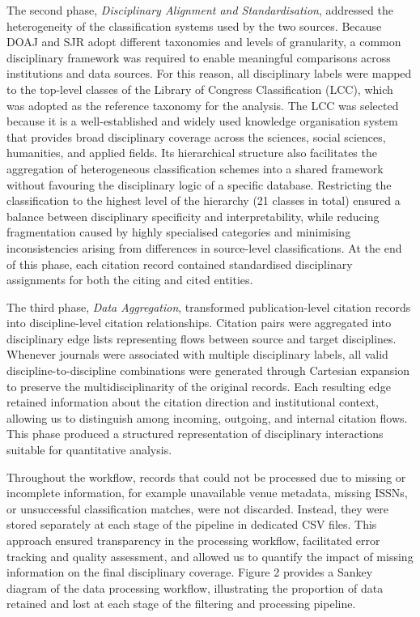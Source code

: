 \documentclass[year=2026]{cup-journal}
\begin{document}
The second phase, \textit{Disciplinary Alignment and Standardisation}, addressed the heterogeneity of the classification systems used by the two sources. Because DOAJ and SJR adopt different taxonomies and levels of granularity, a common disciplinary framework was required to enable meaningful comparisons across institutions and data sources. For this reason, all disciplinary labels were mapped to the top-level classes of the Library of Congress Classification (LCC), which was adopted as the reference taxonomy for the analysis. The LCC was selected because it is a well-established and widely used knowledge organisation system that provides broad disciplinary coverage across the sciences, social sciences, humanities, and applied fields. Its hierarchical structure also facilitates the aggregation of heterogeneous classification schemes into a shared framework without favouring the disciplinary logic of a specific database. Restricting the classification to the highest level of the hierarchy (21 classes in total) ensured a balance between disciplinary specificity and interpretability, while reducing fragmentation caused by highly specialised categories and minimising inconsistencies arising from differences in source-level classifications. At the end of this phase, each citation record contained standardised disciplinary assignments for both the citing and cited entities.

The third phase, \textit{Data Aggregation}, transformed publication-level citation records into discipline-level citation relationships. Citation pairs were aggregated into disciplinary edge lists representing flows between source and target disciplines. Whenever journals were associated with multiple disciplinary labels, all valid discipline-to-discipline combinations were generated through Cartesian expansion to preserve the multidisciplinarity of the original records. Each resulting edge retained information about the citation direction and institutional context, allowing us to distinguish among incoming, outgoing, and internal citation flows. This phase produced a structured representation of disciplinary interactions suitable for quantitative analysis.

Throughout the workflow, records that could not be processed due to missing or incomplete information, for example unavailable venue metadata, missing ISSNs, or unsuccessful classification matches, were not discarded. Instead, they were stored separately at each stage of the pipeline in dedicated CSV files. This approach ensured transparency in the processing workflow, facilitated error tracking and quality assessment, and allowed us to quantify the impact of missing information on the final disciplinary coverage. Figure 2 provides a Sankey diagram of the data processing workflow, illustrating the proportion of data retained and lost at each stage of the filtering and processing pipeline.
\end{document}
